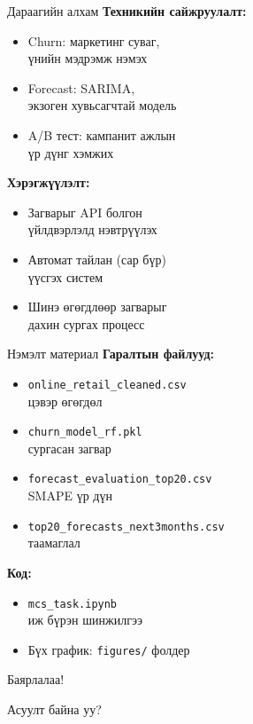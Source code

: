 \documentclass{beamer}
\begin{document}
\begin{frame}{Дараагийн алхам}
\small
\textbf{Техникийн сайжруулалт:}
\begin{itemize}
    \item Churn: маркетинг суваг,\\үнийн мэдрэмж нэмэх
    \item Forecast: SARIMA,\\экзоген хувьсагчтай модель
    \item A/B тест: кампанит ажлын\\үр дүнг хэмжих
\end{itemize}

\vspace{0.2cm}
\textbf{Хэрэгжүүлэлт:}
\begin{itemize}
    \item Загварыг API болгон\\үйлдвэрлэлд нэвтрүүлэх
    \item Автомат тайлан (сар бүр)\\үүсгэх систем
    \item Шинэ өгөгдлөөр загварыг\\дахин сургах процесс
\end{itemize}
\end{frame}

\begin{frame}{Нэмэлт материал}
\small
\textbf{Гаралтын файлууд:}
\begin{itemize}
    \item \texttt{online\_retail\_cleaned.csv}\\цэвэр өгөгдөл
    \item \texttt{churn\_model\_rf.pkl}\\сургасан загвар
    \item \texttt{forecast\_evaluation\_top20.csv}\\SMAPE үр дүн
    \item \texttt{top20\_forecasts\_next3months.csv}\\таамаглал
\end{itemize}

\vspace{0.2cm}
\textbf{Код:}
\begin{itemize}
    \item \texttt{mcs\_task.ipynb}\\иж бүрэн шинжилгээ
    \item Бүх график: \texttt{figures/} фолдер
\end{itemize}
\end{frame}

\begin{frame}
\centering
\Huge Баярлалаа!

\vspace{1cm}

\Large Асуулт байна уу?
\end{frame}
\end{document}
